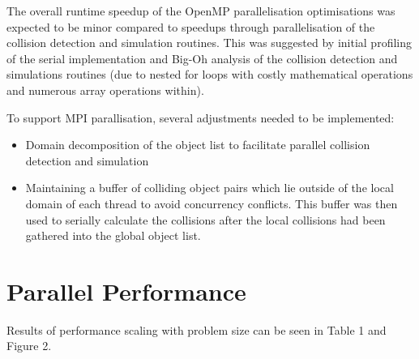 \documentclass[twoside,twocolumn]{article}
\begin{document}
	The overall runtime speedup of the OpenMP parallelisation optimisations was expected to be minor compared to speedups through parallelisation of the collision detection and simulation routines. \newline
	This was suggested by initial profiling of the serial implementation and Big-Oh analysis of the collision detection and simulations routines (due to nested for loops with costly mathematical operations and numerous array operations within). \newline
	
	To support MPI parallisation, several adjustments needed to be implemented:
	
		\begin{itemize}
			\item Domain decomposition of the object list to facilitate parallel collision detection and simulation
			\item Maintaining a buffer of colliding object pairs which lie outside of the local domain of each thread to avoid concurrency conflicts.  \newline
			This buffer was then used to serially calculate the collisions after the local collisions had been gathered into the global object list. 
		\end{itemize}
		

	
		
	
	\section{Parallel Performance}
	Results of performance scaling with problem size can be seen in Table 1 and Figure 2. \newline
	
\end{document}

